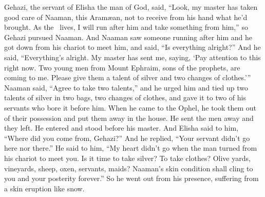 \begin{inparaenum}
   Gehazi, the servant of Elisha the man of God, said, ``Look, my master has taken good care of Naaman, this Aram\ae{}an, not to receive from his hand what he'd brought. As the \lord\ lives, I will run after him and take something from him,''%
   so Gehazi pursued Naaman. And Naaman saw someone running after him and he got down from his chariot to meet him, and said, ``Is everything alright?''%
   And he said, ``Everything's alright. My master has sent me, saying, `Pay attention to this right now. Two young men from Mount Ephraim, sons of the prophets, are coming to me. Please give them a talent of silver and two changes of clothes.'\thinspace''%
   Naaman said, ``Agree to take two talents,'' and he urged him and tied up two talents of silver in two bags, two changes of clothes, and gave it to two of his servants who bore it before him.%
   When he came to the Ophel, he took them out of their possession and put them away in the house. He sent the men away and they left.%
   He entered and stood before his master. And Elisha said to him, ``Where did you come from, Gehazi?'' And he replied, ``Your servant didn't go here nor there.''%
   He said to him, ``My heart didn't go when the man turned from his chariot to meet you.  Is it time to take silver? To take clothes? Olive yards, vineyards, sheep, oxen, servants, maids?%
   Naaman's skin condition shall cling to you and your posterity forever.'' So he went out from his presence, suffering from a skin eruption like snow.%
\end{inparaenum}
